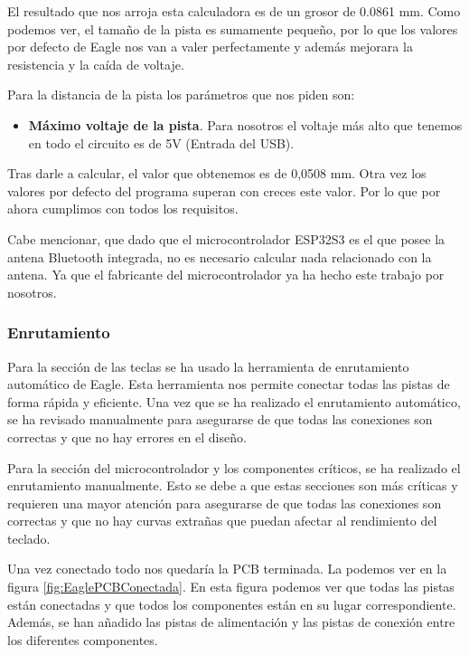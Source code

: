 El resultado que nos arroja esta calculadora es de un grosor de 0.0861 mm. Como podemos ver, el tamaño de la pista es sumamente pequeño, por lo que los valores por defecto de Eagle nos van a valer perfectamente y además mejorara la resistencia y la caída de voltaje.

Para la distancia de la pista los parámetros que nos piden son:
\begin{itemize}
    \item \textbf{Máximo voltaje de la pista}. Para nosotros el voltaje más alto que tenemos en todo el circuito es de 5V (Entrada del \gls{USB}).
\end{itemize}

Tras darle a calcular, el valor que obtenemos es de 0,0508 mm. Otra vez los valores por defecto del programa superan con creces este valor. Por lo que por ahora cumplimos con todos los requisitos.

Cabe mencionar, que dado que el microcontrolador ESP32S3 es el que posee la antena \gls{Bluetooth} integrada, no es necesario calcular nada relacionado con la antena. Ya que el fabricante del microcontrolador ya ha hecho este trabajo por nosotros.

\subsubsection{Enrutamiento}
Para la sección de las teclas se ha usado la herramienta de enrutamiento automático de Eagle. Esta herramienta nos permite conectar todas las pistas de forma rápida y eficiente. Una vez que se ha realizado el enrutamiento automático, se ha revisado manualmente para asegurarse de que todas las conexiones son correctas y que no hay errores en el diseño.

Para la sección del microcontrolador y los componentes críticos, se ha realizado el enrutamiento manualmente. Esto se debe a que estas secciones son más críticas y requieren una mayor atención para asegurarse de que todas las conexiones son correctas y que no hay curvas extrañas que puedan afectar al rendimiento del teclado.

Una vez conectado todo nos quedaría la \gls{PCB} terminada. La podemos ver en la figura \ref{fig:EaglePCBConectada}. En esta figura podemos ver que todas las pistas están conectadas y que todos los componentes están en su lugar correspondiente. Además, se han añadido las pistas de alimentación y las pistas de conexión entre los diferentes componentes.

